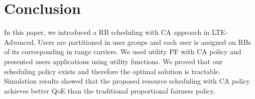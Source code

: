 \documentclass[conference]{IEEEtran}
\begin{document}
\section{Conclusion}\label{sec:conclude}
In this paper, we introduced a RB scheduling with CA approach in LTE-Advanced. Users are partitioned in user groups and each user is assigned on RBs of its corresponding in range carriers. We used utility PF with CA policy and presented users applications using utility functions. We proved that our scheduling policy exists and therefore the optimal solution is tractable. Simulation results showed that the proposed resource scheduling with CA policy achieves better QoE than the traditional proportional fairness policy. 




\end{document}
